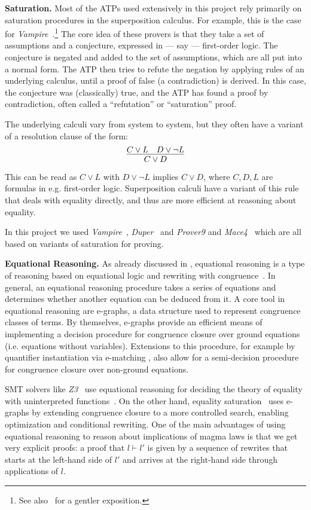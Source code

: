 \textbf{Saturation.}
Most of the ATPs used extensively in this project rely primarily on saturation procedures in the superposition calculus.
For example, this is the case for \emph{Vampire}~\cite{DBLP:conf/cav/KovacsV13}.\footnote{See also~\cite{DBLP:journals/cacm/BentkampBNTVW23} for a gentler exposition.}
The core idea of these provers is that they take a set of assumptions and a conjecture, expressed in --- say --- first-order logic.
The conjecture is negated and added to the set of assumptions, which are all put into a normal form.
The ATP then tries to refute the negation by applying rules of an underlying calculus, until a proof of false (a contradiction) is derived.
In this case, the conjecture was (classically) true, and the ATP has found a proof by contradiction, often called a ``refutation'' or ``saturation'' proof.

The underlying calculi vary from system to system, but they often have a variant of a resolution clause of the form:
\[\infer{C \lor D}{C \lor L \quad D \lor \neg L} \]
This can be read as $C \lor L$ with $D \lor \neg L$ implies $C \lor D$, where $C, D, L$ are formulas in e.g. first-order logic.
Superposition calculi have a variant of this rule that deals with equality directly, and thus are more efficient at reasoning about equality.

In this project we used \emph{Vampire}~\cite{DBLP:conf/cav/KovacsV13}, \emph{Duper}~\cite{DBLP:conf/itp/CluneQBA24} and \emph{Prover9} and \emph{Mace4}~\cite{prover9-mace4} which are all based on variants of saturation for proving.

\textbf{Equational Reasoning.} As already discussed in , equational reasoning is a type of reasoning based on equational logic and rewriting with congruence~\cite{term-rewriting}.
In general, an equational reasoning procedure takes a series of equations and determines whether another equation can be deduced from it.
A core tool in equational reasoning are e-graphs, a data structure used to represent congruence classes of terms.
By themselves, e-graphs provide an efficient means of implementing a decision procedure for congruence closure over ground equations (i.e. equations without variables).
Extensions to this procedure, for example by quantifier instantiation via e-matching \cite{DBLP:conf/cade/MouraB07}, also allow for a semi-decision procedure for congruence closure over non-ground equations.

SMT solvers like \emph{Z3}~\cite{DBLP:conf/tacas/MouraB08} use equational reasoning for deciding the theory of equality with uninterpreted functions~\cite{DBLP:series/txtcs/KroeningS16,DBLP:conf/cade/MouraB07}.
On the other hand, equality saturation~\cite{DBLP:journals/pacmpl/WillseyNWFTP21} uses e-graphs by extending congruence closure to a more controlled search, enabling optimization and conditional rewriting.
One of the main advantages of using equational reasoning to reason about implications of magma laws is that we get very explicit proofs: a proof that $l \vdash l'$ is given by a sequence of rewrites that starts at the left-hand side of $l'$ and arrives at the right-hand side through applications of $l$.

